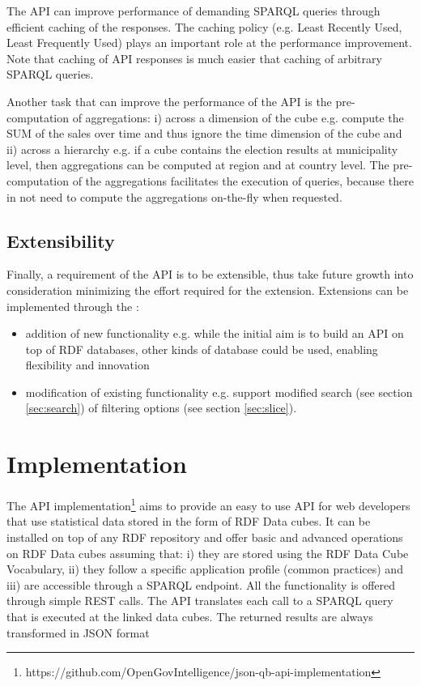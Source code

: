 \documentclass{llncs}
\begin{document}
The API can improve performance of demanding SPARQL queries through efficient caching of the responses. The caching policy (e.g. Least Recently Used, Least Frequently Used) plays an important role at the performance improvement. Note that caching of API responses is much easier that caching of arbitrary SPARQL queries. 

Another task that can improve the performance of the API is the pre-computation of aggregations: i) across a dimension of the cube e.g. compute the SUM of the sales over time and thus ignore the time dimension of the cube and ii) across a hierarchy e.g. if a cube contains the election results at municipality level, then aggregations can be computed at region and at country level. The pre-computation of the aggregations facilitates the execution of queries, because there in not need to compute the aggregations on-the-fly when requested. 


\subsection{Extensibility}

Finally, a requirement of the API is to be extensible, thus take future growth into consideration minimizing the effort required for the extension. Extensions can be implemented through the :
\begin{itemize}
\item addition of new functionality e.g. while the initial aim is to build an API on top of RDF databases, other kinds of database could be used, enabling flexibility and innovation
\item modification of existing functionality e.g. support modified search (see section \ref{sec:search}) of filtering options (see section \ref{sec:slice}).
\end{itemize} 


\section{Implementation}\label{sec:impl}


The API implementation\footnote{https://github.com/OpenGovIntelligence/json-qb-api-implementation} aims to provide an easy to use API for web developers that use statistical data stored in the form of RDF Data cubes. It  can be installed on top of any RDF repository and offer basic and advanced operations on RDF Data cubes assuming that: i) they are stored using the RDF Data Cube Vocabulary, ii) they follow a specific application profile (common practices) and iii) are accessible through a SPARQL endpoint.  All the functionality is offered through simple REST calls. The API translates each call to a SPARQL query that is executed at the linked data cubes. The returned results are always transformed  in JSON format 
\end{document}
